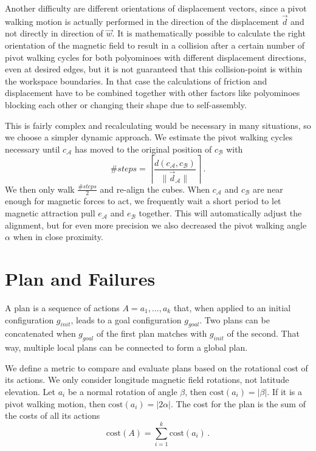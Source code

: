 Another difficulty are different orientations of displacement vectors, since a pivot walking motion is actually performed in the direction of the displacement $\vec{d}$ and not directly in direction of $\vec{w}$.
It is mathematically possible to calculate the right orientation of the magnetic field to result in a collision after a certain number of pivot walking cycles for both polyominoes with different displacement directions, even at desired edges, but it is not guaranteed that this collision-point is within the workspace boundaries.
In that case the calculations of friction and displacement have to be combined together with other factors like polyominoes blocking each other or changing their shape due to self-assembly.

This is fairly complex and recalculating would be necessary in many situations, so we choose a simpler dynamic approach.
We estimate the pivot walking cycles necessary until $c_\mathcal{A}$ has moved to the original position of $c_\mathcal{B}$ with
\begin{equation}
\#\textit{steps} = \left\lceil \frac{d(c_\mathcal{A}, c_\mathcal{B})}{\lVert \vec{d}_\mathcal{A} \rVert} \right\rceil \,.
\end{equation}
We then only walk $\frac{\#\textit{steps}}{2}$ and re-align the cubes.
When $c_\mathcal{A}$ and $c_\mathcal{B}$ are near enough for magnetic forces to act, we frequently wait a short period to let magnetic attraction pull $e_\mathcal{A}$ and $e_\mathcal{B}$ together.
This will automatically adjust the alignment, but for even more precision we also decreased the pivot walking angle $\alpha$ when in close proximity.

\section{Plan and Failures}
\label{sec:plan}

A plan is a sequence of actions $A = a_1, ... , a_k$ that, when applied to an initial configuration $g_\textit{init}$, leads to a goal configuration $g_\textit{goal}$.
Two plans can be concatenated when $g_\textit{goal}$ of the first plan matches with $g_\textit{init}$ of the second.
That way, multiple local plans can be connected to form a global plan.

We define a metric to compare and evaluate plans based on the rotational cost of its actions.
We only consider longitude magnetic field rotations, not latitude elevation.
Let $a_i$ be a normal rotation of angle $\beta$, then $\text{cost}(a_i) = |\beta|$.
If it is a pivot walking motion, then $\text{cost}(a_i) = |2\alpha|$.
The cost for the plan is the sum of the costs of all its actions
\begin{equation}
\text{cost}(A) = \sum_{i=1}^{k} \text{cost}(a_i) \,.
\end{equation}

